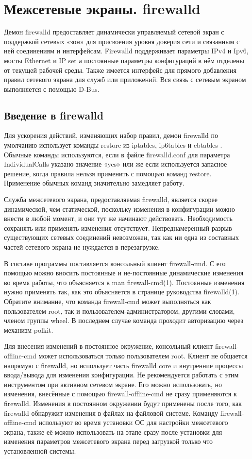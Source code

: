 \documentclass[a4paper,10pt,twoside]{article}
\begin{document}
\section{Межсетевые экраны. firewalld}

Демон firewalld предоставляет динамически управляемый сетевой экран с поддержкой сетевых «зон» для присвоения уровня доверия сети и связанным с ней соединениям и интерфейсам. Firewalld поддерживает параметры IPv4 и Ipv6, мосты Ethernet и IP set а постоянные параметры конфигураций в нём отделены от текущей рабочей среды. Также имеется интерфейс для прямого добавления правил сетевого экрана для служб или приложений. Вся связь с сетевым экраном выполняется с помощью D-Bus.

\subsection{Введение в firewalld}

Для ускорения действий, изменяющих набор правил, демон firewalld по умолчанию использует команды restore из iptables, ip6tables и ebtables . Обычные команды используются, если в файле firewalld.conf для параметра IndividualCalls указано значение «yes» или же если используется запасное решение, когда правила нельзя применить с помощью команд restore. Применение обычных команд значительно замедляет работу.

Служба межсетевого экрана, предоставляемая firewalld, является скорее динамической, чем статической, поскольку изменения в конфигурации можно внести в любой момент, и они тут же начинают действовать. Необходимость сохранять или применять изменения отсутствует. Непреднамеренный разрыв существующих сетевых соединений невозможен, так как ни одна из составных частей сетевого экрана не нуждается в перезагрузке.

В составе программы поставляется консольный клиент firewall-cmd. С его помощью можно вносить постоянные и не-постоянные динамические изменения во время работы, что объясняется в man firewall-cmd(1). Постоянные изменения нужно применять так, как это объясняется в странице руководства firewalld(1). Обратите внимание, что команда firewall-cmd может выполняться как пользователем root, так и пользователем-администратором, другими словами, членом группы wheel. В последнем случае команда проходит авторизацию через механизм polkit.


Для внесения изменений в постоянное окружение, консольный клиент firewall-offline-cmd может использоваться только пользователем root. Клиент не общается напрямую с firewalld, но использует часть firewalld core и внутренние процессы ввода/вывода для изменения конфигурации. Не рекомендуется работать с этим инструментом при активном сетевом экране. Его можно использовать, но изменения, внесённые с помощью  firewall-offline-cmd не сразу применяются к firewalld. Изменения в постоянном окружении будут применены после того, как firewalld обнаружит изменения в файлах на файловой системе. Команду firewall-offline-cmd используют во время установки ОС для настройки межсетевого экрана, также её можно использовать на этапе сразу после установки для изменения параметров межсетевого экрана перед загрузкой только что установленной системы.
\end{document}
